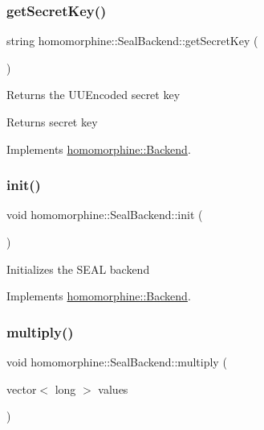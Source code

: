 \subsubsection{\texorpdfstring{getSecretKey()}{getSecretKey()}}
{\footnotesize\ttfamily string homomorphine\+::\+Seal\+Backend\+::get\+Secret\+Key (\begin{DoxyParamCaption}{ }\end{DoxyParamCaption})\hspace{0.3cm}{\ttfamily [virtual]}}

Returns the U\+U\+Encoded secret key

\begin{DoxyReturn}{Returns}
secret key 
\end{DoxyReturn}


Implements \mbox{\hyperlink{classhomomorphine_1_1_backend_a456cb97febfd3819ab400d9583c97153}{homomorphine\+::\+Backend}}.

\mbox{\label{classhomomorphine_1_1_seal_backend_a106556100ae5f2e9dadfa9fc64603d94}} 
\subsubsection{\texorpdfstring{init()}{init()}}
{\footnotesize\ttfamily void homomorphine\+::\+Seal\+Backend\+::init (\begin{DoxyParamCaption}{ }\end{DoxyParamCaption})\hspace{0.3cm}{\ttfamily [virtual]}}

Initializes the S\+E\+AL backend 

Implements \mbox{\hyperlink{classhomomorphine_1_1_backend_a8ac9e6b5d747ecd4db48d1bf1c1b7a8c}{homomorphine\+::\+Backend}}.

\mbox{\label{classhomomorphine_1_1_seal_backend_ace0bb8cd6a0e4b22f6e3e7ab00ea1197}} 
\subsubsection{\texorpdfstring{multiply()}{multiply()}\hspace{0.1cm}{\footnotesize\ttfamily [1/2]}}
{\footnotesize\ttfamily void homomorphine\+::\+Seal\+Backend\+::multiply (\begin{DoxyParamCaption}\item[{vector$<$ long $>$}]{values }\end{DoxyParamCaption})\hspace{0.3cm}{\ttfamily [virtual]}}

